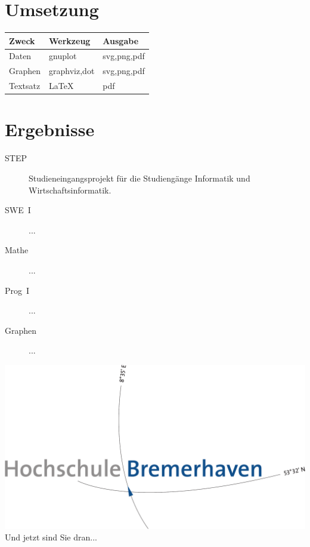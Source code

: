 \documentclass[paper=a1,pagesize,parskip=half-,fontsize=24.88pt]{scrartcl}
\begin{document}
\begin{multicols*}{3}
\blindtext[1]


\section*{Umsetzung}
\blindtext[1]

\begin{tabularx}{\linewidth}{XXX}
\toprule
\textbf{Zweck} & \textbf{Werkzeug} & \textbf{Ausgabe} \\
\midrule
Daten    & gnuplot      & svg,png,pdf \\
Graphen  & graphviz,dot & svg,png,pdf \\
Textsatz & \LaTeX{}     & pdf \\
\bottomrule
\end{tabularx}


\section*{Ergebnisse}
\blindtext[1]

  \begin{description}
    \item[STEP] Studieneingangsprojekt für die Studiengänge Informatik und Wirtschaftsinformatik.
    \item[SWE~I] ...
    \item[Mathe] ...
    \item[Prog~I] ...
    \item[Graphen] ...
  \end{description}

\vfill
\includegraphics[width=\linewidth]{logo}
\vfill
Und jetzt sind Sie dran...
\end{multicols*}
\end{document}
